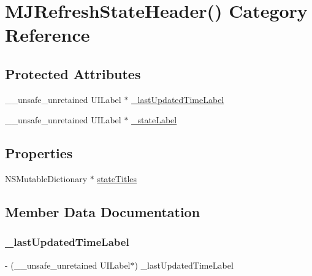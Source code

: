 \hypertarget{category_m_j_refresh_state_header_07_08}{}\section{M\+J\+Refresh\+State\+Header() Category Reference}
\label{category_m_j_refresh_state_header_07_08}
\subsection*{Protected Attributes}
\begin{DoxyCompactItemize}
\item 
\+\_\+\+\_\+unsafe\+\_\+unretained U\+I\+Label $\ast$ \mbox{\hyperlink{category_m_j_refresh_state_header_07_08_a6f8598769b258dec0c91da9ab3a58e66}{\+\_\+last\+Updated\+Time\+Label}}
\item 
\+\_\+\+\_\+unsafe\+\_\+unretained U\+I\+Label $\ast$ \mbox{\hyperlink{category_m_j_refresh_state_header_07_08_a2abf862ed3e55135b6aae0d28e868691}{\+\_\+state\+Label}}
\end{DoxyCompactItemize}
\subsection*{Properties}
\begin{DoxyCompactItemize}
\item 
N\+S\+Mutable\+Dictionary $\ast$ \mbox{\hyperlink{category_m_j_refresh_state_header_07_08_a0373c3a279c7e6ab719fd6a241b26161}{state\+Titles}}
\end{DoxyCompactItemize}


\subsection{Member Data Documentation}
\mbox{\label{category_m_j_refresh_state_header_07_08_a6f8598769b258dec0c91da9ab3a58e66}} 
\subsubsection{\texorpdfstring{\+\_\+last\+Updated\+Time\+Label}{\_lastUpdatedTimeLabel}}
{\footnotesize\ttfamily -\/ (\+\_\+\+\_\+unsafe\+\_\+unretained U\+I\+Label$\ast$) \+\_\+last\+Updated\+Time\+Label\hspace{0.3cm}{\ttfamily [protected]}}

